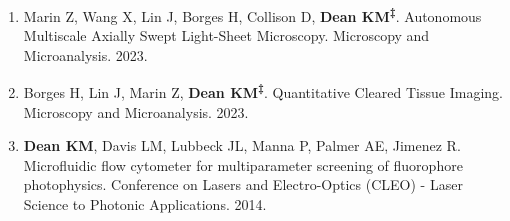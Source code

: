 \begin{enumerate}

\item Marin Z, Wang X, Lin J, Borges H, Collison D, \textbf{Dean KM\textsuperscript{‡}}. Autonomous Multiscale Axially Swept Light-Sheet Microscopy. Microscopy and Microanalysis. 2023.

\item Borges H, Lin J, Marin Z, \textbf{Dean KM\textsuperscript{‡}}. Quantitative Cleared Tissue Imaging. Microscopy and Microanalysis. 2023.

\item \textbf{Dean KM}, Davis LM, Lubbeck JL, Manna P, Palmer AE, Jimenez R. Microfluidic flow cytometer for multiparameter screening of fluorophore photophysics. Conference on Lasers and Electro-Optics (CLEO) - Laser Science to Photonic Applications. 2014.

\end{enumerate}
